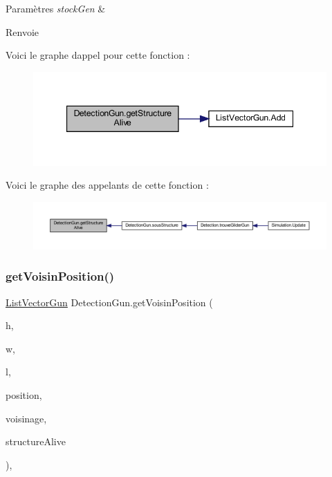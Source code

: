 \begin{DoxyParams}{Paramètres}
{\em stock\+Gen} & \\
\hline
\end{DoxyParams}
\begin{DoxyReturn}{Renvoie}

\end{DoxyReturn}
Voici le graphe d\textquotesingle{}appel pour cette fonction \+:
\nopagebreak
\begin{figure}[H]
\begin{center}
\leavevmode
\includegraphics[width=347pt]{class_detection_gun_a488d963e0b78922904b6bd42182ca7b1_cgraph}
\end{center}
\end{figure}
Voici le graphe des appelants de cette fonction \+:
\nopagebreak
\begin{figure}[H]
\begin{center}
\leavevmode
\includegraphics[width=350pt]{class_detection_gun_a488d963e0b78922904b6bd42182ca7b1_icgraph}
\end{center}
\end{figure}
\mbox{\label{class_detection_gun_a6699b4b7269779a62a69bd56422128c1}} 
\subsubsection{\texorpdfstring{get\+Voisin\+Position()}{getVoisinPosition()}}
{\footnotesize\ttfamily \mbox{\hyperlink{class_list_vector_gun}{List\+Vector\+Gun}} Detection\+Gun.\+get\+Voisin\+Position (\begin{DoxyParamCaption}\item[{int}]{h,  }\item[{int}]{w,  }\item[{int}]{l,  }\item[{Vector3}]{position,  }\item[{Voisinage2}]{voisinage,  }\item[{\mbox{\hyperlink{class_list_vector_gun}{List\+Vector\+Gun}}}]{structure\+Alive }\end{DoxyParamCaption})\hspace{0.3cm}{\ttfamily [inline]}, {\ttfamily [private]}}



